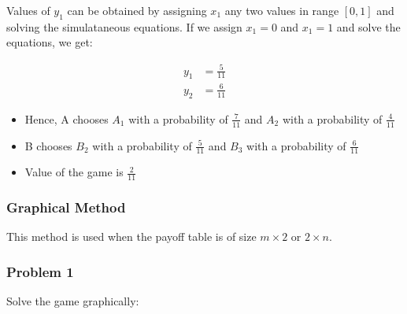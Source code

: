 \documentclass[12pt]{article}
\begin{document}
Values of $y_1$ can be obtained by assigning $x_1$  any two values in range $[0,1]$ and solving the simulataneous equations. 
If we assign $x_1 = 0$ and  $x_1 = 1$ and solve the equations, we get:

\begin{align*}
  y_1 &= \frac{5}{11} \\
  y_2 &= \frac{6}{11}
\end{align*}

\begin{itemize}
\item Hence, A chooses $A_1$ with a probability of $\frac{7}{11}$ and $A_2$ with a probability of $\frac{4}{11}$
\item B chooses $B_2$ with a probability of $\frac{5}{11}$ and $B_3$ with a probability of $\frac{6}{11}$
\item Value of the game is $\frac{2}{11}$
\end{itemize}

\subsubsection{Graphical Method}
This method is used when the payoff table is of size $m\times 2$ or $2\times n$. 

\subsubsection*{Problem 1}
Solve the game graphically:
\end{document}

